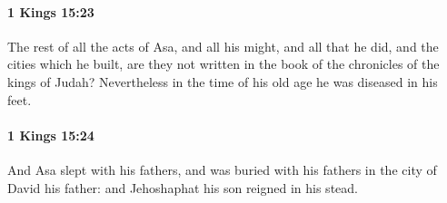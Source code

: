 		\paragraph{1 Kings 15:23} %
			\label{1KINGS-15-23}

			The rest of all the acts of Asa, and all his might, and all that he did, and the cities which he built, are they not written in the book of the chronicles of the kings of Judah? Nevertheless in the time of his old age he was diseased in his feet.


		\paragraph{1 Kings 15:24} %
			\label{1KINGS-15-24}

			And Asa slept with his fathers, and was buried with his fathers in the city of David his father: and Jehoshaphat his son reigned in his stead.

